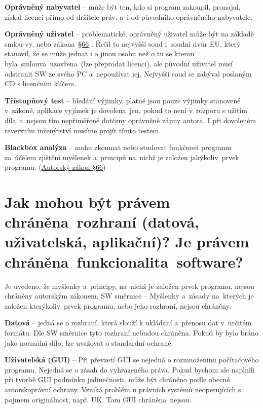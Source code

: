 \textbf{Oprávněný nabyvatel} -- může být ten, kdo si program zakoupil, pronajal, získal licenci přímo od držitele práv, a~i od původního oprávněného nabyvatele.

\textbf{Oprávněný uživatel} -- problematické, oprávněný uživatel může být na základě smlou-vy, nebo zákona~\href{https://www.zakonyprolidi.cz/cs/2000-121#p66-6}{§66} . Řešil to nejvyšší soud i~soudní dvůr EU, který stanovil, že se může jednat i o jinou osobu než o tu se kterou byla~smlouva~uzavřena~(lze přeprodat licenci), ale původní uživatel musí odstranit SW ze svého PC a~nepoužívat jej. Nejvyšší soud se zabýval poslaným CD s licenčním klíčem.

\textbf{Třístupňový test} -- hledání výjimky, platné jsou pouze výjimky stanovené v~zákoně, aplikace vyjímek je dovolena~jen, pokud to není v~rozporu s užitím díla~a~nejsou tím nepřiměřeně dotčeny oprávněné zájmy autora. I při dovoleném reverzním inženýrství musíme projít tímto testem.

\textbf{Blackbox analýza} -- mohu zkoumat nebo studovat funkčnost programu za~účelem zjištění myšlenek a~principů na~nichž je založen jakýkoliv~prvek programu. (\href{https://www.zakonyprolidi.cz/cs/2000-121#p66}{Autorský zákon §66})


\section{Jak mohou být právem chráněna~rozhraní (datová, uživatelská, aplikační)? Je právem chráněna~funkcionalita~software?}

Je uvedeno, že myšlenky a~principy, na~nichž je založen prvek programu, nejsou chráněny autorským zákonem. SW směrnice -- Myšlenky a~zásady na~kterých je založen kterýkoliv~prvek programu, nebo jeho rozhraní, nejsou chráněny.

\textbf{Datová} -- jedná se o rozhraní, která slouží k ukládaní a~přenosu dat v~určitém formátu. Dle SW směrnice tyto rozhraní nebudou chráněna. Pokud by bylo bráno jako normální dílo, lze uvažovat o standardní ochraně.

\textbf{Uživatelská (GUI)} -- Při převzetí GUI se nejedná o rozmnoženinu počítačového programu. \textrightarrow Nejedná se o zásah do vyhrazeného práva. Pokud bychom ale naplnili při tvorbě GUI podmínku jedinečnosti, může být chráněno podle obecné autorskoprávní ochrany. Vzniká problém u právních systémů neoperujících s pojmem originálnost, např. UK\@. Tam GUI chráněna~nejsou.

